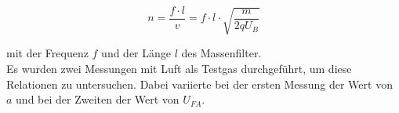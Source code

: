 \begin{equation}
n = \frac{f\cdot l}{v}= f\cdot l \cdot \sqrt{\frac{m}{2qU_B}}
\end{equation}

mit der Frequenz $f$ und der Länge $l$ des Massenfilter.\\
Es wurden zwei Messungen mit Luft als Testgas durchgeführt, um diese Relationen zu untersuchen. Dabei variierte bei der ersten Messung der Wert von $a$ und bei der Zweiten der Wert von $U_{FA}$.

